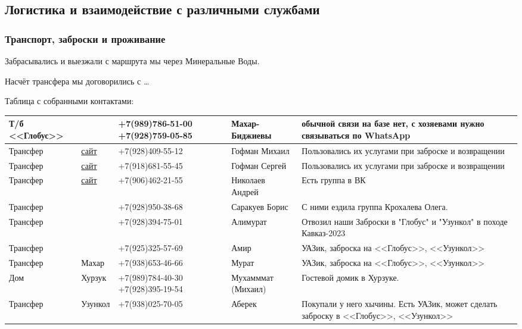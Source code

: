 	\subsection{Логистика и взаимодействие с различными службами}
		\subsubsection{Транспорт, заброски и проживание}

			Забрасывались и выезжали с маршрута мы через Минеральные Воды.
			
			Насчёт трансфера мы договорились с \dots

			Таблица с собранными контактами:
			\setlength{\arrayrulewidth}{0.2mm}
			\setlength{\tabcolsep}{0pt}
			\renewcommand{\arraystretch}{1}
			\begin{longtable}{|>{\centering\arraybackslash}m{3cm}|>{\centering\arraybackslash}m{2cm}|>{\centering\arraybackslash}m{4cm}|>{\centering\arraybackslash}m{4cm}|>{\centering\arraybackslash}m{5cm}|} \hline
				Т/б <<Глобус>> 	&											&	+7(989)786-51-00 +7(928)759-05-85	&	Махар-Биджиевы		&	обычной связи на базе нет, с хозяевами нужно связываться по WhatsApp                	\\ \hline
				Трансфер 		&	\href{https://transfer-tur.ru}{сайт}	&	+7(928)409-55-12					&	Гофман Михаил		&	Пользовались их услугами при заброске и возвращении                                 	\\ \hline
				Трансфер 		&	\href{https://transfer-tur.ru}{сайт}	&	+7(918)681-55-45					&	Гофман Сергей		&	Пользовались их услугами при заброске и возвращении                                 	\\ \hline
				Трансфер 		&	\href{http://minvodytransfer.ru}{сайт}	&	+7(906)462-21-55					&	Николаев Андрей		&	Есть группа в ВК                                                                    	\\ \hline
				Трансфер 		& 											&	+7(928)950-38-68					&	Саракуев Борис		&	С ними ездила группа Крохалева Олега.                                               	\\ \hline
				Трансфер 		& 											&	+7(928)394-75-01					&	Алимурат			&	Отвозил наши Заброски в "Глобус" и "Узункол" в походе Кавказ-2023                   	\\ \hline
				Трансфер 		& 											&	+7(925)325-57-69					&	Амир				&	УАЗик, заброска на <<Глобус>>, <<Узункол>>                                          	\\ \hline
				Трансфер 		&	Махар	 								&	+7(938)653-46-66					&	Мурат				&	УАЗик, заброска на <<Глобус>>, <<Узункол>>                                          	\\ \hline
				Дом		 		&	Хурзук	 								&	+7(989)784-40-30 +7(928)395-19-54	&	Мухамммат (Михаил)	&	Гостевой домик в Хурзуке.                                                           	\\ \hline
				Трансфер 		&	Узункол	 								&	+7(938)025-70-05					&	Аберек				&	Покупали у него хычины. Есть УАЗик, может сделать заброску в <<Глобус>>, <<Узункол>>	\\ \hline
			\end{longtable}
